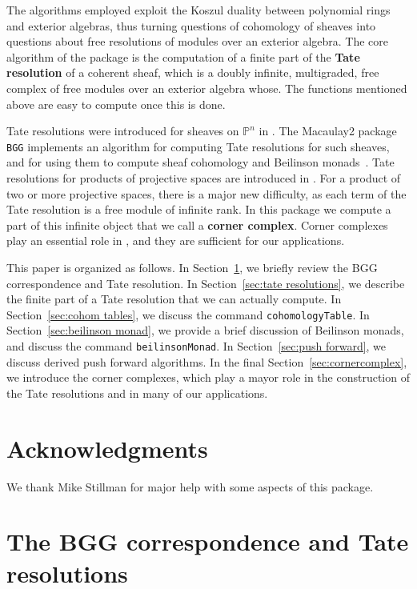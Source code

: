 \documentclass[twoside,12pt, leqno]{amsart}
\def\PP{{\mathbb P}}
\begin{document}
The algorithms employed exploit the Koszul duality between polynomial rings and exterior algebras, thus turning questions of cohomology of sheaves into questions about free resolutions of modules over an exterior algebra.  The core algorithm of the package is the computation of a finite part of the {\bf Tate resolution} of a coherent sheaf, which is a doubly infinite, multigraded, free complex of free modules over an exterior algebra whose.  The functions mentioned above are easy to compute once this is done.

Tate resolutions were introduced for sheaves on $\PP^n$ in \cite{EFS}.  The Macaulay2 package {\tt BGG} implements an algorithm for computing Tate resolutions for such sheaves, and for using them to compute sheaf cohomology and Beilinson monads~\cite{M2BGG}.  Tate resolutions for products of projective spaces are introduced in \cite{EES}.  
For a product of two or more projective spaces, there is a major new difficulty, as each term of the Tate resolution is a free module of infinite rank.  
In this package we compute a part of this infinite object that we call a {\bf corner complex}.  Corner complexes play an essential role in \cite{EES}, and they are sufficient for our applications.

This paper is organized as follows.  In Section~\ref{sec:background}, we briefly review the BGG correspondence and Tate resolution.  In Section~\ref{sec:tate resolutions}, we describe the finite part of a Tate resolution that we can actually compute.  In Section~\ref{sec:cohom tables}, we discuss the command {\tt cohomologyTable}.  
In Section~\ref{sec:beilinson monad}, we provide a brief discussion of Beilinson monads, and discuss the command {\tt beilinsonMonad}.  In Section~\ref{sec:push forward}, we discuss derived push forward algorithms. In the final Section~\ref{sec:cornercomplex}, we introduce the corner complexes, which play a mayor role in the construction of the Tate resolutions and in many of our applications.

\section*{Acknowledgments}
We thank Mike Stillman for major help with some aspects of this package.

\section{The BGG correspondence and Tate resolutions}\label{sec:background}
\end{document}
